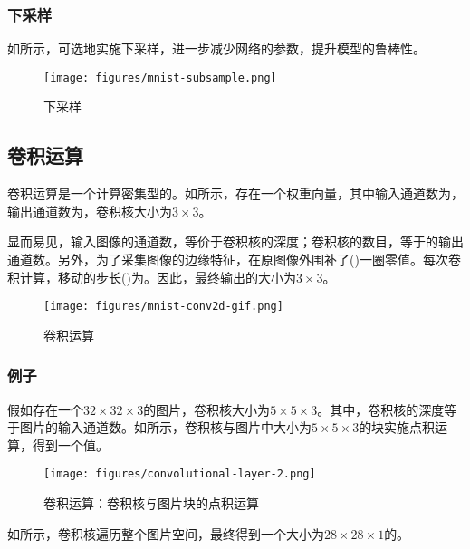 \begin{content}
\subsubsection{下采样}

如所示，可选地实施下采样，进一步减少网络的参数，提升模型的鲁棒性。

\begin{figure}[H]
\centering
\texttt{[image: figures/mnist-subsample.png]}
\caption{下采样}
 \label{fig:mnist-subsample}
\end{figure}

\subsection{卷积运算}

卷积运算是一个计算密集型的。如所示，存在一个权重向量，其中输入通道数为，输出通道数为，卷积核大小为$3 \times 3$。

显而易见，输入图像的通道数，等价于卷积核的深度；卷积核的数目，等于的输出通道数。另外，为了采集图像的边缘特征，在原图像外围补了()一圈零值。每次卷积计算，移动的步长()为。因此，最终输出的大小为$3 \times 3$。

\begin{figure}[H]
\centering
\texttt{[image: figures/mnist-conv2d-gif.png]}
\caption{卷积运算}
 \label{fig:mnist-conv2d-gif}
\end{figure}

\subsubsection{例子}

假如存在一个$32 \times 32 \times 3$的图片，卷积核大小为$5 \times 5 \times 3$。其中，卷积核的深度等于图片的输入通道数。如所示，卷积核与图片中大小为$5 \times 5 \times 3$的块实施点积运算，得到一个值。

\begin{figure}[H]
\centering
\texttt{[image: figures/convolutional-layer-2.png]}
\caption{卷积运算：卷积核与图片块的点积运算}
 \label{fig:mnist-conv-1dot}
\end{figure}

如所示，卷积核遍历整个图片空间，最终得到一个大小为$28 \times 28 \times 1$的。


\end{content}
